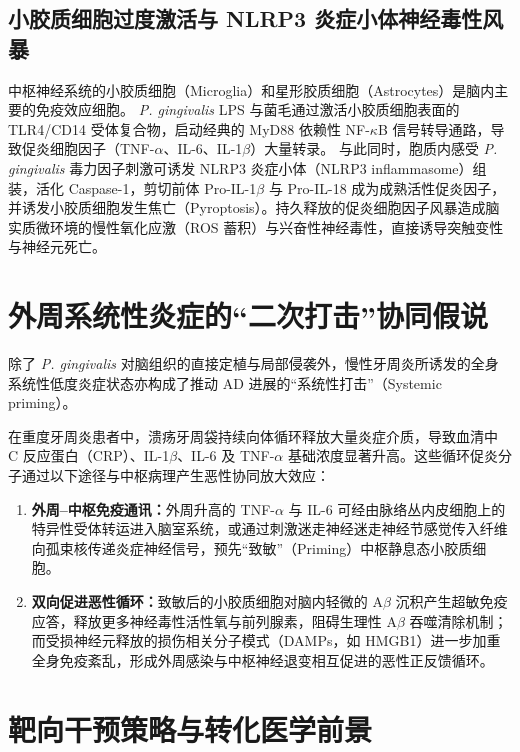 \documentclass[12pt,a4paper]{ctexart}
\begin{document}
\subsection{小胶质细胞过度激活与 NLRP3 炎症小体神经毒性风暴}
中枢神经系统的小胶质细胞（Microglia）和星形胶质细胞（Astrocytes）是脑内主要的免疫效应细胞。
\textit{P. gingivalis} LPS 与菌毛通过激活小胶质细胞表面的 TLR4/CD14 受体复合物，启动经典的 MyD88 依赖性 NF-$\kappa$B 信号转导通路，导致促炎细胞因子（TNF-$\alpha$、IL-6、IL-1$\beta$）大量转录\cite{poole2013, zhangjing2017}。
与此同时，胞质内感受 \textit{P. gingivalis} 毒力因子刺激可诱发 NLRP3 炎症小体（NLRP3 inflammasome）组装，活化 Caspase-1，剪切前体 Pro-IL-1$\beta$ 与 Pro-IL-18 成为成熟活性促炎因子，并诱发小胶质细胞发生焦亡（Pyroptosis）。持久释放的促炎细胞因子风暴造成脑实质微环境的慢性氧化应激（ROS 蓄积）与兴奋性神经毒性，直接诱导突触变性与神经元死亡\cite{ren2024}。

\section{外周系统性炎症的“二次打击”协同假说}

除了 \textit{P. gingivalis} 对脑组织的直接定植与局部侵袭外，慢性牙周炎所诱发的全身系统性低度炎症状态亦构成了推动 AD 进展的“系统性打击”（Systemic priming）\cite{kamer2008}。

在重度牙周炎患者中，溃疡牙周袋持续向体循环释放大量炎症介质，导致血清中 C 反应蛋白（CRP）、IL-1$\beta$、IL-6 及 TNF-$\alpha$ 基础浓度显著升高。这些循环促炎分子通过以下途径与中枢病理产生恶性协同放大效应：
\begin{enumerate}
    \item \textbf{外周--中枢免疫通讯：}外周升高的 TNF-$\alpha$ 与 IL-6 可经由脉络丛内皮细胞上的特异性受体转运进入脑室系统，或通过刺激迷走神经迷走神经节感觉传入纤维向孤束核传递炎症神经信号，预先“致敏”（Priming）中枢静息态小胶质细胞\cite{kamer2008, zhangjing2017}。
    \item \textbf{双向促进恶性循环：}致敏后的小胶质细胞对脑内轻微的 A$\beta$ 沉积产生超敏免疫应答，释放更多神经毒性活性氧与前列腺素，阻碍生理性 A$\beta$ 吞噬清除机制；而受损神经元释放的损伤相关分子模式（DAMPs，如 HMGB1）进一步加重全身免疫紊乱，形成外周感染与中枢神经退变相互促进的恶性正反馈循环\cite{nieran2019, zhang2020}。
\end{enumerate}

\section{靶向干预策略与转化医学前景}
\end{document}

